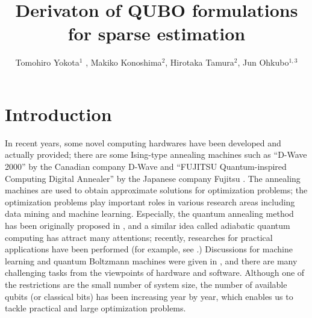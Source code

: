 \documentclass[fp,twocolumn]{jpsj3}
\title{Derivaton of QUBO formulations for sparse estimation}
\author{Tomohiro Yokota$^1$%
  , Makiko Konoshima$^2$, Hirotaka Tamura$^2$, Jun Ohkubo$^{1,3}$}
\begin{document}
\maketitle

\section{Introduction}

In recent years, some novel computing hardwares have been developed and actually provided; 
there are some Ising-type annealing machines such as ``D-Wave 2000'' by the Canadian company D-Wave \cite{d-wave01,d-wave02} and ``FUJITSU Quantum-inspired Computing Digital Annealer'' by the Japanese company Fujitsu \cite{DA}. 
The annealing machines are used to obtain approximate solutions for optimization problems; the optimization problems play important roles in various research areas including data mining and machine learning.
Especially, the quantum annealing method has been originally proposed in \cite{Kadowaki1998}, and a similar idea called adiabatic quantum computing \cite{Farhi2001} has attract many attentions; recently, researches for practical applications have been performed (for example, see \cite{Tanahashi2019}.) 
Discussions for machine learning and quantum Boltzmann machines were given in \cite{Biamonte}, and there are many challenging tasks from the viewpoints of hardware and software. 
Although one of the restrictions are the small number of system size, the number of available qubits (or classical bits) has been increasing year by year, which enables us to tackle practical and large optimization problems.


\end{document}
